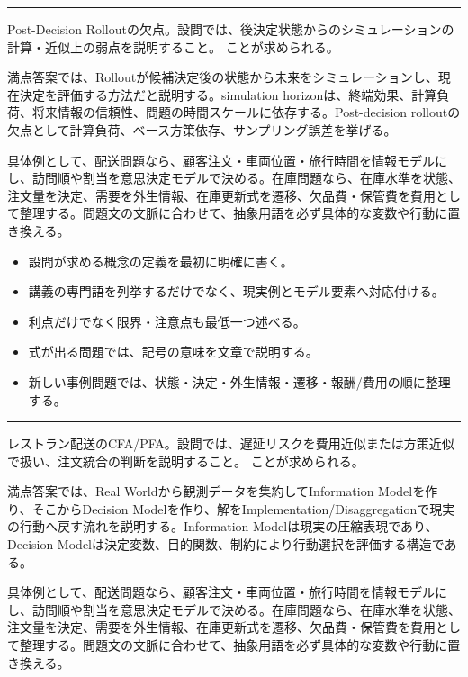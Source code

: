 \vspace{2mm}\hrule\vspace{2mm}
Post-Decision Rolloutの欠点。設問では、後決定状態からのシミュレーションの計算・近似上の弱点を説明すること。 ことが求められる。\par
{}
満点答案では、Rolloutが候補決定後の状態から未来をシミュレーションし、現在決定を評価する方法だと説明する。simulation horizonは、終端効果、計算負荷、将来情報の信頼性、問題の時間スケールに依存する。Post-decision rolloutの欠点として計算負荷、ベース方策依存、サンプリング誤差を挙げる。\par
{}
具体例として、配送問題なら、顧客注文・車両位置・旅行時間を情報モデルにし、訪問順や割当を意思決定モデルで決める。在庫問題なら、在庫水準を状態、注文量を決定、需要を外生情報、在庫更新式を遷移、欠品費・保管費を費用として整理する。問題文の文脈に合わせて、抽象用語を必ず具体的な変数や行動に置き換える。\par
{}
\begin{itemize}
\item 設問が求める概念の定義を最初に明確に書く。
\item 講義の専門語を列挙するだけでなく、現実例とモデル要素へ対応付ける。
\item 利点だけでなく限界・注意点も最低一つ述べる。
\item 式が出る問題では、記号の意味を文章で説明する。
\item 新しい事例問題では、状態・決定・外生情報・遷移・報酬/費用の順に整理する。
\end{itemize}
\vspace{2mm}\hrule\vspace{2mm}
レストラン配送のCFA/PFA。設問では、遅延リスクを費用近似または方策近似で扱い、注文統合の判断を説明すること。 ことが求められる。\par
{}
満点答案では、Real Worldから観測データを集約してInformation Modelを作り、そこからDecision Modelを作り、解をImplementation/Disaggregationで現実の行動へ戻す流れを説明する。Information Modelは現実の圧縮表現であり、Decision Modelは決定変数、目的関数、制約により行動選択を評価する構造である。\par
{}
具体例として、配送問題なら、顧客注文・車両位置・旅行時間を情報モデルにし、訪問順や割当を意思決定モデルで決める。在庫問題なら、在庫水準を状態、注文量を決定、需要を外生情報、在庫更新式を遷移、欠品費・保管費を費用として整理する。問題文の文脈に合わせて、抽象用語を必ず具体的な変数や行動に置き換える。\par
